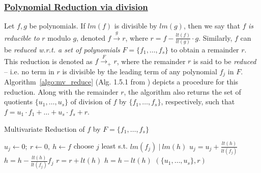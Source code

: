 \subsubsection{\underline{Polynomial Reduction via division}} Let $f,
g$ be 
polynomials. If $lm(f)$ is divisible by $lm(g)$, then we say that $f$
{\it is reducible to} $r$ modulo $g$, denoted
$f\stackrel{g}{\textstyle\longrightarrow}r$, where
$r = f - {\frac{lt(f)}{lt(g)}} \cdot g$. Similarly, $f$ can be {\it
  reduced  w.r.t. a set of polynomials}  $F = \{f_1, \dots, f_s\}$ to
obtain a remainder $r$. This reduction is denoted as $f \stackrel{F}
{\textstyle \longrightarrow}_+ r$, where the remainder $r$ is said to
be {\it reduced} -- i.e. no term in $r$ is divisible by the leading
term of any polynomial $f_j$ in $F$. Algorithm~\ref{algo:mv_reduce}
(Alg. 1.5.1 from \cite{gb_book}) depicts a procedure for this
reduction. Along with the remainder $r$, the algorithm also returns
the set of quotients $\{u_1,\dots,u_s\}$ of division of $f$ by
$\{f_1,\dots,f_s\}$, respectively, such that $f = u_1\cdot
f_1+\dots+u_s\cdot f_s + r$. 
\vspace{0.075in}

{\small
\begin{algorithm}[hbt]
 \caption{Multivariate Reduction of $f$ by $F=\{f_1,\dots,f_s\}$}
 \label{algo:mv_reduce}
 \begin{algorithmic}[1]
 \State $u_j \gets 0; ~r \gets 0, ~h \gets f $ 
 \State choose $j$ least s.t. $lm(f_j) ~|~ lm(h)$
 \State $u_j = u_j + \frac{lt(h)}{lt(f_j)}$
 \State $h = h - \frac{lt(h)}{lt(f_j)} f_j$
 \Else
 \State $r = r+ lt(h)$
 \State $h = h - lt(h)$
 \EndIf
 \EndWhile
 \State \Return $(\{u_1,\dots,u_s\} , r)$
 \EndProcedure
 \end{algorithmic}
 \end{algorithm}
}


